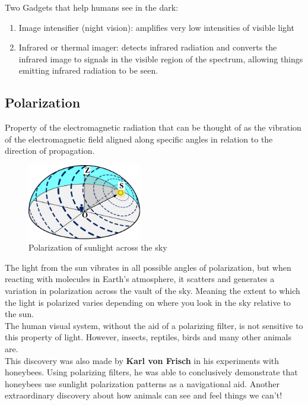 \documentclass{article}
\begin{document}
\noindent Two Gadgets that help humans see in the dark: 
\begin{enumerate}
    \item Image intensifier (night vision): amplifies very low intensities of visible light 
    \item Infrared or thermal imager: detects infrared radiation and converts the infrared image to signals in the visible region of the spectrum, allowing things emitting infrared radiation to be seen. 
\end{enumerate}

\subsection{Polarization}
Property of the electromagnetic radiation that can be thought of as the vibration of the electromagnetic field aligned along specific angles in relation to the direction of propagation. \\

\begin{figure}[htp]
\centering
\includegraphics[width=5cm]{images/polarization.jpg}
\caption{Polarization of sunlight across the sky}
\label{fig: Sun Polarization}
\end{figure}

The light from the sun vibrates in all possible angles of polarization, but when reacting with molecules in Earth's atmosphere, it scatters and generates a variation in polarization across the vault of the sky. Meaning the extent to which the light is polarized varies depending on where you look in the sky relative to the sun. \\

The human visual system, without the aid of a polarizing filter, is not sensitive to this property of light. However, insects, reptiles, birds and many other animals are. \\

This discovery was also made by \textbf{Karl von Frisch} in his experiments with honeybees. Using polarizing filters, he was able to conclusively demonstrate that honeybees use sunlight polarization patterns as a navigational aid. Another extraordinary discovery about how animals can see and feel things we can't! \\
\end{document}
